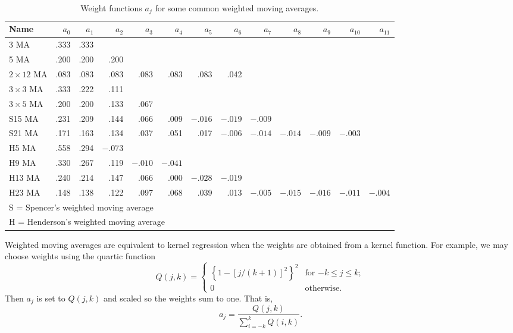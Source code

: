 \documentclass[10pt]{article}
\begin{document}
\begin{table}[!b]
\caption{Weight functions $a_j$ for some common weighted moving averages.}\label{table:weights}
{\begin{small}\setlength{\tabcolsep}{0.15cm}
\begin{tabular}{lrrrrrrrrrrrr}
\hline
\bf Name & $a_0$ & $a_1$ & $a_2$ & $a_3$ & $a_4$ & $a_5$ & $a_6$ & $a_7$ &
$a_8$ & $a_9$ & $a_{10}$ & $a_{11}$ \\
\hline
3 MA & .333 & .333 \\
5 MA & .200 & .200 & .200 \\
$2\times12$ MA & .083 & .083 & .083 & .083 & .083 & .083 & .042\\
$3\times3$ MA & .333 & .222 & .111 \\
$3\times5$ MA & .200 & .200 & .133 & .067 \\
S15 MA & .231 & .209 & .144 & .066 & .009 & $-.016$ & $-.019$ & $-.009$ \\
S21 MA & .171 & .163 & .134 & .037 & .051 & .017 &$-.006$ & $-.014$ & $-.014$ & $-.009$ & $-.003$\\
H5 MA & .558 & .294 & $-.073$ \\
H9 MA & .330 & .267 & .119 & $-.010$ & $-.041$ \\
H13 MA & .240 & .214 & .147 & .066 & .000 & $-.028$ & $-.019$\\
H23 MA & .148 & .138 & .122 & .097 & .068 & .039 & .013 & $-.005$ & $-.015$ & $-.016$ & $-.011$ & $-.004$\\
\hline
\multicolumn{9}{l}{S = Spencer's weighted moving average} \\
\multicolumn{9}{l}{H = Henderson's weighted moving average}\\
\hline
\end{tabular}\end{small}
}\end{table}

Weighted moving averages are equivalent to kernel regression when the weights are obtained from a kernel function. For example, we may choose weights using the quartic function
\[
Q(j,k) = \left\{\begin{array}{ll}
                \left\{1 - [j/(k+1)]^2\right\}^2 & \text{for $-k \le j \le k$}; \\
                0       & \text{otherwise.}
                \end{array}\right.
\]
Then $a_j$ is set to $Q(j,k)$ and scaled so the weights sum to one.  That is,
\begin{equation}
a_j = \frac{Q(j,k)}{\displaystyle\sum_{i=-k}^k Q(i,k)}.
\label{eq:qweights}
\end{equation}
\end{document}

